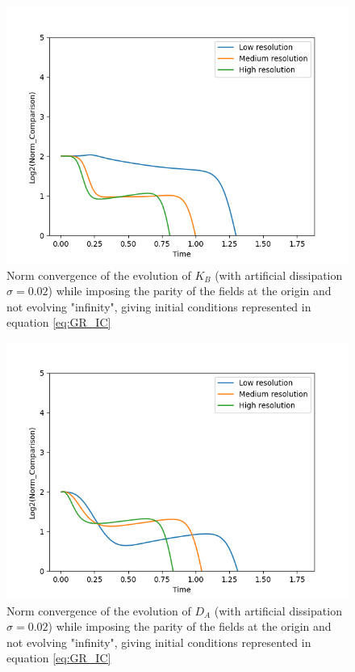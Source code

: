 \begin{figure}[H]
    \centering
    \includegraphics[width=0.9\columnwidth]{Images/KB-norm.png}
    \caption{Norm convergence of the evolution of $K_B$ (with artificial dissipation $\sigma = 0.02$) while imposing the parity of the fields at the origin and not evolving "infinity", giving initial conditions represented in equation \ref{eq:GR_IC}}
    \label{fig:norm_KB}
\end{figure}

\newpage

\begin{figure}[H]
    \centering
    \includegraphics[width=0.9\columnwidth]{Images/DA-norm.png}
    \caption{Norm convergence of the evolution of $D_A$ (with artificial dissipation $\sigma = 0.02$) while imposing the parity of the fields at the origin and not evolving "infinity", giving initial conditions represented in equation \ref{eq:GR_IC}}
    \label{fig:norm_DA}
\end{figure}

